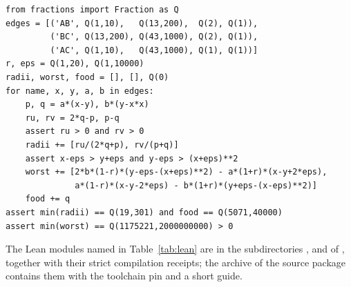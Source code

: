 \documentclass[11pt,a4paper]{article}
\theoremstyle{plain}
\theoremstyle{definition}
\theoremstyle{remark}
\begin{document}
\begin{verbatim}
from fractions import Fraction as Q
edges = [('AB', Q(1,10),   Q(13,200),  Q(2), Q(1)),
         ('BC', Q(13,200), Q(43,1000), Q(2), Q(1)),
         ('AC', Q(1,10),   Q(43,1000), Q(1), Q(1))]
r, eps = Q(1,20), Q(1,10000)
radii, worst, food = [], [], Q(0)
for name, x, y, a, b in edges:
    p, q = a*(x-y), b*(y-x*x)
    ru, rv = 2*q-p, p-q
    assert ru > 0 and rv > 0
    radii += [ru/(2*q+p), rv/(p+q)]
    assert x-eps > y+eps and y-eps > (x+eps)**2
    worst += [2*b*(1-r)*(y-eps-(x+eps)**2) - a*(1+r)*(x-y+2*eps),
              a*(1-r)*(x-y-2*eps) - b*(1+r)*(y+eps-(x-eps)**2)]
    food += q
assert min(radii) == Q(19,301) and food == Q(5071,40000)
assert min(worst) == Q(1175221,2000000000) > 0
\end{verbatim}

The Lean modules named in Table~\ref{tab:lean} are in the subdirectories ,  and  of , together with their strict compilation receipts; the archive  of the source package contains them with the toolchain pin and a short guide.



\end{document}
